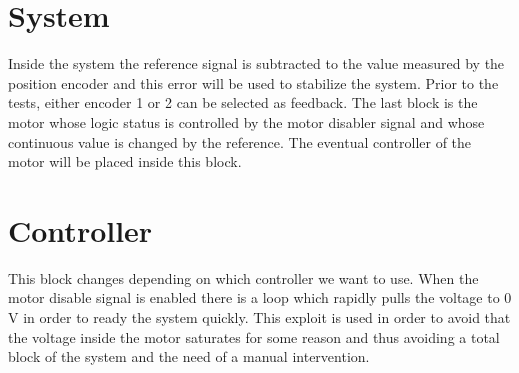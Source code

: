 \section{System}
Inside the system the reference signal is subtracted to the value measured by the position encoder and this error will be used to stabilize the system. Prior to the tests, either encoder 1 or 2 can be selected as feedback.
The last block is the motor whose logic status is controlled by the motor disabler signal and whose continuous value is changed by the reference.
The eventual controller of the motor will be placed inside this block.

\section{Controller}
This block changes depending on which controller we want to use. When the motor disable signal is enabled there is a loop which rapidly pulls the voltage to 0 V in order to ready the system quickly. This exploit is used in order to avoid that the voltage inside the motor saturates for some reason and thus avoiding a total block of the system and the need of a manual intervention.

